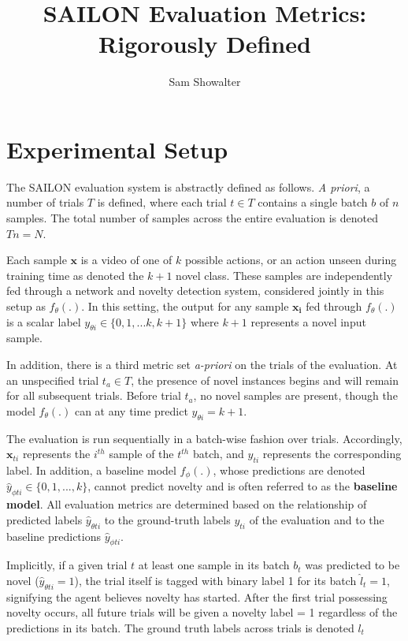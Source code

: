 \documentclass[11pt]{article}
\begin{document}
\title{SAILON Evaluation Metrics: Rigorously Defined}
\author{Sam Showalter}
\maketitle

\medskip
\section{Experimental Setup}

The SAILON evaluation system is abstractly defined as follows. \textit{A priori}, a number of trials $T$ is defined, where each trial $t \in T$ contains a single batch $b$ of $n$ samples. The total number of samples across the entire evaluation is denoted $Tn = N$. 

Each sample $\mathbf{x}$ is a video of one of $k$ possible actions, or an action unseen during training time as denoted the $k + 1$ novel class. These samples are independently fed through a network and novelty detection system, considered jointly in this setup as $f_\theta(.)$. In this setting, the output for any sample $\mathbf{x_i}$ fed through $f_\theta(.)$ is a scalar label $y_{\theta i} \in \{0,1, ... k, k+1\}$ where $k + 1$ represents a novel input sample.

In addition, there is a third metric set \textit{a-priori} on the trials of the evaluation. At an unspecified trial $t_a \in T$, the presence of novel instances begins and will remain for all subsequent trials. Before trial $t_a$, no novel samples are present, though the model $f_\theta(.)$ can at any time predict $y_{\theta i} = k + 1$. 

The evaluation is run sequentially in a batch-wise fashion over trials. Accordingly, $\mathbf{x}_{ti}$ represents the $i^{th}$ sample of the $t^{th}$ batch, and $y_{ti}$ represents the corresponding label. In addition, a baseline model $f_\phi(.)$, whose predictions are denoted $\hat{y}_{\phi ti} \in \{0, 1, ... , k\}$, cannot predict novelty and is often referred to as the \textbf{baseline model}. All evaluation metrics are determined based on the relationship of predicted labels $\hat{y}_{\theta ti}$ to the ground-truth labels $y_{ti}$ of the evaluation and to the baseline predictions $\hat{y}_{\phi ti}$.

Implicitly, if a given trial $t$ at least one sample in its batch $b_t$ was predicted to be novel ($\hat{y}_{\theta ti} = 1$), the trial itself is tagged with binary label 1 for its batch $\hat{l}_t = 1$, signifying the agent believes novelty has started. After the first trial possessing novelty occurs, all future trials will be given a novelty label = 1 regardless of the predictions in its batch. The ground truth labels across trials is denoted $l_t$
\end{document}
